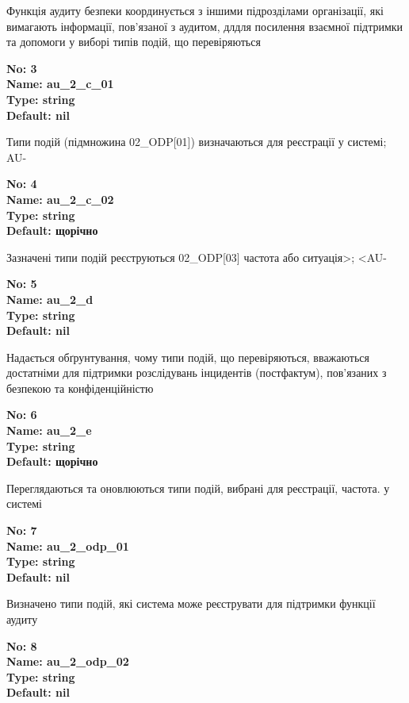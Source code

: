 \documentclass{article}
\begin{document}
{\footnotesize Функція аудиту безпеки координується з іншими підрозділами організації, які вимагають інформації, пов'язаної з аудитом, длдля посилення взаємної підтримки та допомоги у виборі типів подій, що перевіряються}


{\footnotesize\bfseries
No: 3\\
Name: au\_\allowbreak{}2\_\allowbreak{}c\_\allowbreak{}01\\
Type: string\\
Default: nil
}

{\footnotesize Типи подій (підмножина 02\_\allowbreak{}ODP[01]) визначаються для реєстрації у системі; AU-}


{\footnotesize\bfseries
No: 4\\
Name: au\_\allowbreak{}2\_\allowbreak{}c\_\allowbreak{}02\\
Type: string\\
Default: \textquotedbl{}щорічно\textquotedbl{}
}

{\footnotesize Зазначені типи подій реєструються 02\_\allowbreak{}ODP[03] частота або ситуація>; <AU-}


{\footnotesize\bfseries
No: 5\\
Name: au\_\allowbreak{}2\_\allowbreak{}d\\
Type: string\\
Default: nil
}

{\footnotesize Надається обґрунтування, чому типи подій, що перевіряються, вважаються достатніми для підтримки розслідувань інцидентів (постфактум), пов'язаних з безпекою та конфіденційністю}


{\footnotesize\bfseries
No: 6\\
Name: au\_\allowbreak{}2\_\allowbreak{}e\\
Type: string\\
Default: \textquotedbl{}щорічно\textquotedbl{}
}

{\footnotesize Переглядаються та оновлюються типи подій, вибрані для реєстрації, частота. у системі}


{\footnotesize\bfseries
No: 7\\
Name: au\_\allowbreak{}2\_\allowbreak{}odp\_\allowbreak{}01\\
Type: string\\
Default: nil
}

{\footnotesize Визначено типи подій, які система може реєструвати для підтримки функції аудиту}


{\footnotesize\bfseries
No: 8\\
Name: au\_\allowbreak{}2\_\allowbreak{}odp\_\allowbreak{}02\\
Type: string\\
Default: nil
}
\end{document}
